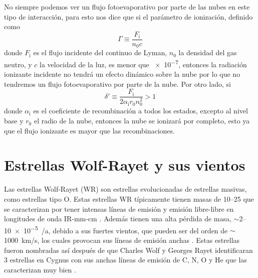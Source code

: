 \documentclass{book}
\begin{document}
No siempre podemos ver un flujo fotoevaporativo por parte de las nubes
en este tipo de interacción, para esto \cite{Bertoldi_1989} nos dice
que si el parámetro de ionización, definido como
\begin{equation}
    \Gamma  \equiv \frac{F_\mathrm{i}}{n_0 c}
\end{equation}
donde $F_\mathrm{i}$ es el flujo incidente del continuo de Lyman,
$n_0$ la densidad del gas neutro, y $c$ la velocidad de la luz, es
menor que \SI{e-7}{}, entonces la radiación ionizante incidente no
tendrá un efecto dinámico sobre la nube por lo que no tendremos un
flujo fotoevaporativo por parte de la nube. Por otro lado, si
\begin{equation}
    \delta'\equiv\frac{F_\mathrm{i}}{2\alpha_\mathrm{i} r_0 n_0^2}>1
\end{equation}
donde $\alpha_\mathrm{i}$ es el coeficiente de recombinación a todos los
estados, excepto al nivel base y $r_0$ el radio de la nube, entonces
la nube se ionizará por completo, esto ya que el flujo ionizante es
mayor que las recombinaciones.


\section{Estrellas Wolf-Rayet y sus vientos}

Las estrellas Wolf-Rayet (WR) son estrellas evolucionadas de estrellas
masivas, como estrellas tipo O. Estas estrellas WR típicamente tienen
masas de 10--\SI{25}{\msun} que se caracterizan por tener intensas
líneas de emisión y emisión libre-libre en longitudes de onda IR-mm-cm
\citep{crowther:2007}. Además tienen una alta pérdida de masa,
$\sim$2--\SI{10e-5}{\msun/a}, debido a sus fuertes vientos, que pueden ser
del orden de $\sim$\SI{1000}{km/s}, los cuales provocan sus líneas de
emisión anchas \citep{Hamman:2006}. Estas estrellas fueron nombradas
así después de que Charles Wolf y Georges Rayet identificaran 3
estrellas en Cygnus con sus anchas líneas de emisión de C, N, O y He
que las caracterizan muy bien \citep{WR:ref}.
\end{document}
